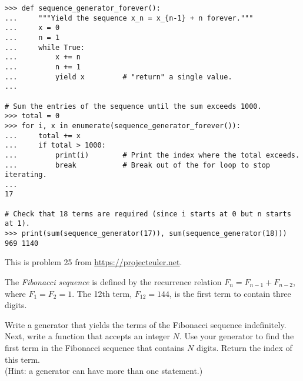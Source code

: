 \begin{lstlisting}
>>> def sequence_generator_forever():
...     """Yield the sequence x_n = x_{n-1} + n forever."""
...     x = 0
...     n = 1
...     while True:
...         x += n
...         n += 1
...         yield x         # "return" a single value.
...

# Sum the entries of the sequence until the sum exceeds 1000.
>>> total = 0
>>> for i, x in enumerate(sequence_generator_forever()):
...     total += x
...     if total > 1000:
...         print(i)        # Print the index where the total exceeds.
...         break           # Break out of the for loop to stop iterating.
...
17

# Check that 18 terms are required (since i starts at 0 but n starts at 1).
>>> print(sum(sequence_generator(17)), sum(sequence_generator(18)))
969 1140
\end{lstlisting}

\begin{problem} %
This is problem 25 from \url{https://projecteuler.net}.

The \emph{Fibonacci sequence} is defined by the recurrence relation $F_{n} = F_{n-1} + F_{n-2}$, where $ F_1 = F_2 = 1$.
The 12th term, $F_{12} = 144$, is the first term to contain three digits.

Write a generator that yields the terms of the Fibonacci sequence indefinitely.
Next, write a function that accepts an integer $N$.
Use your generator to find the first term in the Fibonacci sequence that contains $N$ digits.
Return the index of this term.
\\(Hint: a generator can have more than one  statement.)
\end{problem}



